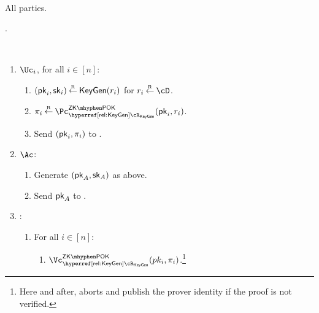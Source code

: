 \begin{protocol}~\label{prot:ConfidentialTransactions:Init}
	

	\item[Participating parties.] All parties.
			
			
	\item[Proofs:]   \piZKPOK{\rKeyGen}. 
	
	
			
\item[Operation:] ~
			
			
			\begin{enumerate}
				
				\item   $\Uc_i$, for  all $i\in [n]$:
				\begin{enumerate}
					\item  $({\mathsf{pk}}_i,{\mathsf{sk}}_i) \mathbin{\stackrel{\mbox{\tiny R}}{\leftarrow}} \mathsf{KeyGen}(r_i)$ for $r_i \getsr \cD$.
					
					
					\item  $\pi_i \getsr \pZKPOK{\rKeyGen}(\pk_i,r_i)$.  
					
					\item Send $({\mathsf{pk}}_i,\pi_i)$ to \Cc.
					
					
				\end{enumerate}
				
				
					\item   $\Auditor$: 
					
					\begin{enumerate}
					\item 		Generate $({\mathsf{pk}}_A,{\mathsf{sk}}_A)$ as above.
					
					\item Send ${\mathsf{pk}}_A$ to \Cc.
					
					\end{enumerate}
				
					
				\item \Cc: ~
				
				\begin{enumerate}
				
				\item For all $i\in [n]$: 
				
				\begin{enumerate}
					\item 	 $\vZKPOK{\rKeyGen}(pk_i,\pi_i)$.\footnote{Here and after,  \Cc aborts and publish the prover identity if the   proof is not verified.}
					

\end{enumerate}
\end{enumerate}
\end{enumerate}
\end{protocol}
